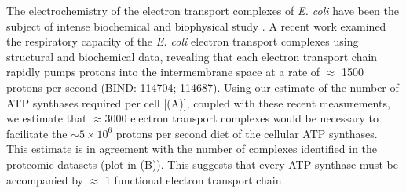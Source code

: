 The electrochemistry of the electron transport complexes of \textit{E. coli}
have been the subject of intense biochemical and biophysical study
\citep{ingledew1984, khademian2017,cox1970,henkel2014}. A recent work
\citep{szenk2017} examined the respiratory capacity of the \textit{E. coli}
electron transport complexes using structural and biochemical data, revealing
that each electron transport chain rapidly pumps protons into the
intermembrane space at a rate of $\approx$ 1500 protons per second (BIND:
114704; 114687). Using our estimate of the number of ATP synthases required
per cell [(A)], coupled with these recent
measurements, we estimate that $\approx 3000$ electron transport complexes
would be necessary to facilitate the $\sim 5 \times 10^6$ protons per second
diet of the cellular ATP synthases. This estimate is in agreement with the
number of complexes identified in the proteomic datasets (plot in
(B)). This suggests that every ATP synthase must be
accompanied by $\approx$ 1 functional electron transport chain.

